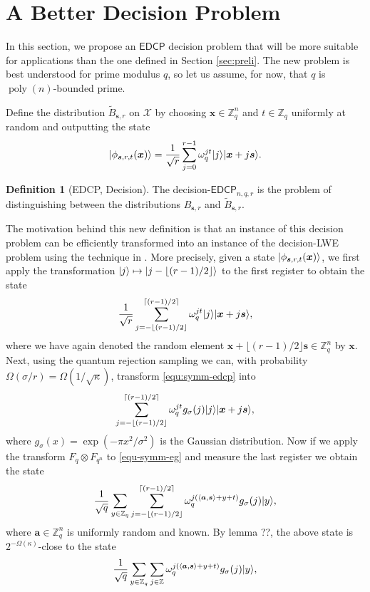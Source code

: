 \documentclass[11pt]{article}
\theoremstyle{plain}
\theoremstyle{definition}
\newtheorem{definition}[theorem]{Definition}
\DeclareMathOperator{\poly}{poly}
\DeclarePairedDelimiter{\ldbrac}{\lvert}{\rangle}
\DeclarePairedDelimiter{\lrang}{\langle}{\rangle}
\def\Z{\ensuremath{\mathbb{Z}}}
\def\edcp{\ensuremath{\mathsf{EDCP}}}
\begin{document}



\section{A Better Decision Problem}

In this section, we propose an $\edcp$ decision problem that will be more suitable for applications than the one defined in Section \ref{sec:preli}. The new problem is best understood for prime modulus $q$, so let us assume, for now, that $q$ is $\poly(n)$-bounded prime.

Define the distribution $\tilde{B}_{\bm{s}, r}$ on $\mathcal{X}$ by choosing $\bm{x} \in \Z_q^n$ and $t \in \Z_q$ uniformly at random and outputting the state
\[ \ldbrac{\phi_{\bm{s}, r, t}(\bm{x})} = \frac{1}{\sqrt{r}} \sum_{j = 0}^{r - 1} \omega_q^{jt} \ldbrac{j}\ldbrac{\bm{x} + j\bm{s}}. \]
\begin{definition}[EDCP, Decision]
    \label{def:d-edcp-n}
     The decision-$\edcp_{n, q, r}$ is the problem of distinguishing between the distributions $B_{\bm{s}, r}$ and $\tilde{B}_{\bm{s}, r}$.
\end{definition}
The motivation behind this new definition is that an instance of this decision problem can be efficiently transformed into an instance of the decision-LWE problem using the technique in \cite{brakerski2018learning}. More precisely, given a state $\ldbrac{\phi_{\bm{s}, r, t}(\bm{x})}$, we first apply the transformation $\ldbrac{j} \mapsto \ldbrac{j - \lfloor (r - 1) / 2 \rfloor}$ to the first register to obtain the state
\begin{equation}
    \label{equ:symm-edcp}
    \frac{1}{\sqrt{r}} \sum_{j = -\lfloor (r - 1) / 2 \rfloor}^{\lceil (r - 1) / 2 \rceil} \omega_q^{jt} \ldbrac{j}\ldbrac{\bm{x} + j\bm{s}},
\end{equation}
where we have again denoted the random element $\bm{x} + \lfloor (r - 1) / 2 \rfloor \bm{s} \in \Z_q^n$ by $\bm{x}$. Next, using the quantum rejection sampling we can, with probability $\Omega(\sigma / r) = \Omega(1 / \sqrt{\kappa})$, transform \eqref{equ:symm-edcp} into 
\begin{equation}
    \label{equ:symm-eg}
    \sum_{j = -\lfloor (r - 1) / 2 \rfloor}^{\lceil (r - 1) / 2 \rceil} \omega_q^{jt} g_\sigma(j) \ldbrac{j}\ldbrac{\bm{x} + j\bm{s}},
\end{equation}
where $g_\sigma(x) = \exp(-\pi x^2 / \sigma^2)$ is the Gaussian distribution. Now if we apply the transform $F_q \otimes F_{q^n}$ to \eqref{equ-symm-eg} and measure the last register we obtain the state
\[ \frac{1}{\sqrt{q}} \sum_{y \in \Z_q} \sum_{j = -\lfloor (r - 1) / 2 \rfloor}^{\lceil (r - 1) / 2 \rceil} \omega_q^{j(\lrang{\bm{a}, \bm{s}} + y + t)} g_\sigma(j) \ldbrac{y},\]
where $\bm{a} \in \Z_q^n$ is uniformly random and known. By lemma ??, the above state is $2^{-\Omega(\kappa)}$-close to the state
\[ \frac{1}{\sqrt{q}} \sum_{y \in \Z_q} \sum_{j \in \Z} \omega_q^{j(\lrang{\bm{a}, \bm{s}} + y + t)} g_\sigma(j) \ldbrac{y},\]
\end{document}
